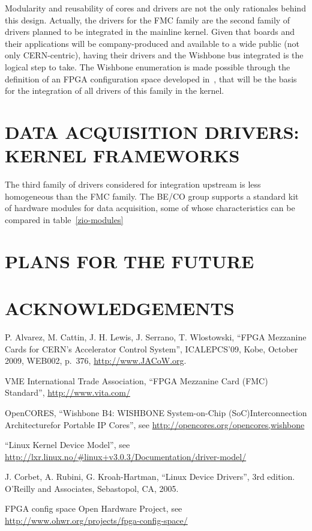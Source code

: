 \documentclass{JAC2003}
\begin{document}
Modularity and reusability of cores and drivers are not the only
rationales behind this design. Actually, the drivers for the FMC family
are the second family of drivers planned to be integrated in the
mainline kernel. Given that boards and their applications will be
company-produced and available to a wide public (not only CERN-centric),
having their drivers and the Wishbone bus integrated is the logical step
to take. The Wishbone enumeration is made possible through the
definition of an FPGA configuration space developed
in~\cite{fpga-config-space}, that will be the basis for the integration of
all drivers of this family in the kernel.

\section{DATA ACQUISITION DRIVERS: KERNEL FRAMEWORKS}

The third family of drivers considered for integration upstream is less
homogeneous than the FMC family. The BE/CO group supports a standard kit
of hardware modules for data acquisition, some of whose characteristics
can be compared in table~\ref{zio-modules}


\section{PLANS FOR THE FUTURE}
\section{ACKNOWLEDGEMENTS}


\begin{thebibliography}{9}   %

P. Alvarez, M. Cattin, J. H. Lewis, J. Serrano, T. Wlostowski,
``FPGA Mezzanine Cards for CERN’s Accelerator Control System'',
ICALEPCS'09, Kobe, October 2009, WEB002, p.~376,
\url{http://www.JACoW.org}.

VME International Trade Association,
``FPGA Mezzanine Card (FMC) Standard'', \url{http://www.vita.com/}

OpenCORES,
``Wishbone B4: WISHBONE System-on-Chip (SoC)Interconnection
Architecturefor Portable IP Cores'',
see \url{http://opencores.org/opencores,wishbone}

``Linux Kernel Device Model'',
see \url{http://lxr.linux.no/#linux+v3.0.3/Documentation/driver-model/}

J. Corbet, A. Rubini, G. Kroah-Hartman, ``Linux Device Drivers'', 3rd
edition. O'Reilly and Associates, Sebastopol, CA, 2005.

 FPGA config space Open Hardware
Project, see
\url{http://www.ohwr.org/projects/fpga-config-space/}

\end{thebibliography}
\end{document}
